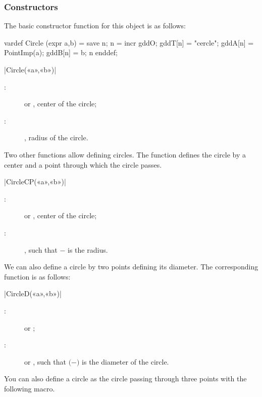 \documentclass[a4paper,english]{article}
\begin{document}
\subsubsection{Constructors}
The basic constructor function for this object is as follows:
\begin{mpcode}
vardef Circle (expr a,b) =
  save n; n = incr gddO;
  gddT[n] = "cercle"; gddA[n] = PointImp(a); gddB[n] = b; n
enddef;
\end{mpcode}
\begin{colourband}
\macro|Circle(«a»,«b»)|
\begin{description}
  \item[:]   or ,
  center of the circle;
  \item[:] , radius of the circle.
\end{description}
\end{colourband}
\bigskip

Two other functions allow defining circles. The  function defines the circle by a center and a point through which the circle passes.
\begin{colourband}
\macro|CircleCP(«a»,«b»)|
\begin{description}
  \item[:]   or ,
  center of the circle;
  \item[:]  ,
  such that $-$ is the radius.
\end{description}
\end{colourband}
\bigskip

We can also define a circle by two points defining its diameter. The corresponding function is as follows:
\begin{colourband}
\macro|CircleD(«a»,«b»)|
\begin{description}
  \item[:]   or  ;
  \item[:]   or ,
  such that $($$-$$)$ is the diameter of the circle.
\end{description}
\end{colourband}
\bigskip

You can also define a circle as the circle passing through three points with
the following macro.
\end{document}
